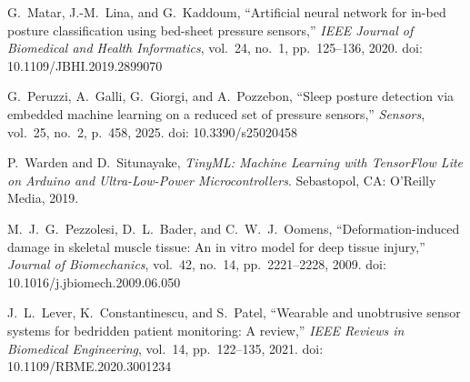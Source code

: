 ﻿\documentclass[11pt,a4paper]{article}
\begin{document}
\begin{enumerate}[leftmargin=*, label={[\arabic*]}, itemsep=0.10em, parsep=0pt, topsep=0.08em]
    \item G.~Matar, J.-M.~Lina, and G.~Kaddoum, ``Artificial neural network for in-bed posture classification using bed-sheet pressure sensors,'' \textit{IEEE Journal of Biomedical and Health Informatics}, vol.~24, no.~1, pp.~125--136, 2020. doi: 10.1109/JBHI.2019.2899070
    
    \item G.~Peruzzi, A.~Galli, G.~Giorgi, and A.~Pozzebon, ``Sleep posture detection via embedded machine learning on a reduced set of pressure sensors,'' \textit{Sensors}, vol.~25, no.~2, p.~458, 2025. doi: 10.3390/s25020458
    
    \item P.~Warden and D.~Situnayake, \textit{TinyML: Machine Learning with TensorFlow Lite on Arduino and Ultra-Low-Power Microcontrollers}. Sebastopol, CA: O'Reilly Media, 2019.
    
    \item M.~J.~G.~Pezzolesi, D.~L.~Bader, and C.~W.~J.~Oomens, ``Deformation-induced damage in skeletal muscle tissue: An in vitro model for deep tissue injury,'' \textit{Journal of Biomechanics}, vol.~42, no.~14, pp.~2221--2228, 2009. doi: 10.1016/j.jbiomech.2009.06.050
    
    \item J.~L.~Lever, K.~Constantinescu, and S.~Patel, ``Wearable and unobtrusive sensor systems for bedridden patient monitoring: A review,'' \textit{IEEE Reviews in Biomedical Engineering}, vol.~14, pp.~122--135, 2021. doi: 10.1109/RBME.2020.3001234
\end{enumerate}
\end{document}
